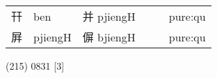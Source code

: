 \documentclass[14pt,a4paper]{scrartcl}
\begin{document}
\begin{longtable}[c]{@{}llllll@{}}
\begin{minipage}[t]{0.14\columnwidth}
幵
\strut\end{minipage} &
\begin{minipage}[t]{0.14\columnwidth}\raggedright\strut
ben
\strut\end{minipage} &
\begin{minipage}[t]{0.14\columnwidth}\raggedright\strut
并 pjiengH
\strut\end{minipage} &
\begin{minipage}[t]{0.14\columnwidth}\raggedright\strut
\strut\end{minipage} &
\begin{minipage}[t]{0.14\columnwidth}\raggedright\strut
\strut\end{minipage} &
\begin{minipage}[t]{0.14\columnwidth}\raggedright\strut
pure:qu
\strut\end{minipage}\tabularnewline
\begin{minipage}[t]{0.14\columnwidth}\raggedright\strut
屛
\strut\end{minipage} &
\begin{minipage}[t]{0.14\columnwidth}\raggedright\strut
pjiengH
\strut\end{minipage} &
\begin{minipage}[t]{0.14\columnwidth}\raggedright\strut
偋 bjiengH
\strut\end{minipage} &
\begin{minipage}[t]{0.14\columnwidth}\raggedright\strut
\strut\end{minipage} &
\begin{minipage}[t]{0.14\columnwidth}\raggedright\strut
\strut\end{minipage} &
\begin{minipage}[t]{0.14\columnwidth}\raggedright\strut
pure:qu
\strut\end{minipage}\tabularnewline
\bottomrule
\end{longtable}

(215) 0831 {[}3{]}
\end{document}
